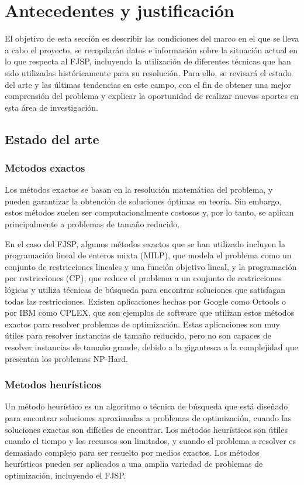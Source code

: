 \section{Antecedentes y justificación}
El objetivo de esta sección es describir las condiciones del marco en el que se
lleva a cabo el proyecto, se recopilarán datos e información sobre la situación
actual en lo que respecta al FJSP, incluyendo la utilización de diferentes
técnicas que han sido utilizadas históricamente para su resolución. Para ello,
se revisará el estado del arte y las últimas tendencias en este campo, con el
fin de obtener una mejor comprensión del problema y explicar la oportunidad de
realizar nuevos aportes en esta área de investigación.

\subsection{Estado del arte}
\subsubsection{Metodos exactos}
Los métodos exactos se basan en la resolución matemática del problema, y pueden
garantizar la obtención de soluciones óptimas en teoría. Sin embargo, estos
métodos suelen ser computacionalmente costosos y, por lo tanto, se aplican
principalmente a problemas de tamaño reducido.\medskip

En el caso del FJSP, algunos métodos exactos que se han utilizado incluyen la
programación lineal de enteros mixta (MILP)\cite{milp}, que modela el problema
como un conjunto de restricciones lineales y una función objetivo lineal, y la
programación por restricciones (CP)\cite{wikiCP}, que reduce el problema a un
conjunto de restricciones lógicas y utiliza técnicas de búsqueda para encontrar
soluciones que satisfagan todas las restricciones. Existen aplicaciones hechas
por Google como Ortools\cite{ortools} o por IBM como CPLEX\cite{cplex}, que son
ejemplos de software que utilizan estos métodos exactos para resolver problemas
de optimización. Estas aplicaciones son muy útiles para resolver instancias de
tamaño reducido, pero no son capaces de resolver instancias de tamaño grande,
debido a la gigantesca a la complejidad que presentan los problemas NP-Hard.

\subsubsection{Metodos heurísticos}
Un método heurístico\cite{Novoseltseva_2021} es un algoritmo o técnica de
búsqueda que está diseñado para encontrar soluciones aproximadas a problemas de
optimización, cuando las soluciones exactas son difíciles de encontrar. Los
métodos heurísticos son útiles cuando el tiempo y los recursos son limitados, y
cuando el problema a resolver es demasiado complejo para ser resuelto por
medios exactos. Los métodos heurísticos pueden ser aplicados a una amplia
variedad de problemas de optimización, incluyendo el FJSP.\medskip

